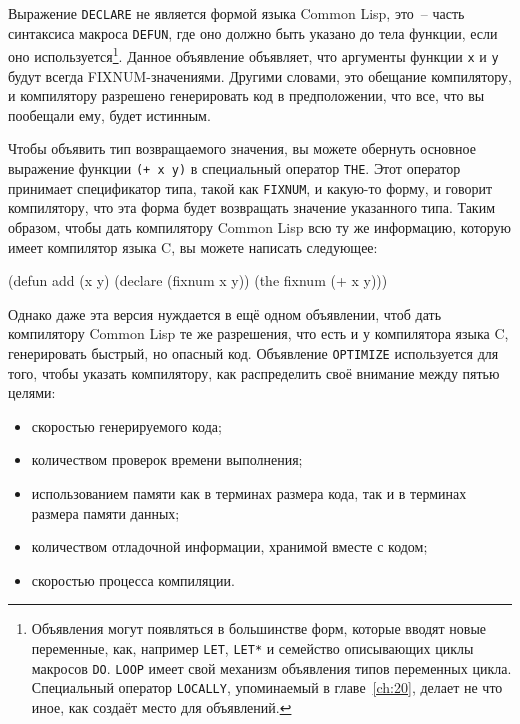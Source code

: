 Выражение \lstinline{DECLARE} не является формой языка Common Lisp, это~-- часть
синтаксиса макроса \lstinline{DEFUN}, где оно должно быть указано до тела функции, если
оно используется\footnote{Объявления могут появляться в большинстве форм, которые вводят
  новые переменные, как, например \lstinline{LET}, \lstinline{LET*} и семейство
  описывающих циклы макросов \lstinline{DO}. \lstinline{LOOP} имеет свой механизм
  объявления типов переменных цикла. Специальный оператор \lstinline{LOCALLY}, упоминаемый
  в главе~\ref{ch:20}, делает не что иное, как создаёт место для объявлений.}\hspace{\footnotenegspace}. Данное
объявление объявляет, что аргументы функции \lstinline{x} и \lstinline{y} будут всегда
FIXNUM-значениями. Другими словами, это обещание компилятору, и компилятору разрешено
генерировать код в предположении, что все, что вы пообещали ему, будет истинным.

Чтобы объявить тип возвращаемого значения, вы можете обернуть основное выражение функции
\lstinline{(+ x y)} в специальный оператор \lstinline{THE}. Этот оператор принимает спецификатор
типа, такой как \lstinline{FIXNUM}, и какую-то форму, и говорит компилятору, что эта форма
будет возвращать значение указанного типа. Таким образом, чтобы дать компилятору Common
Lisp всю ту же информацию, которую имеет компилятор языка C, вы можете написать следующее:

\begin{myverb}
(defun add (x y)
  (declare (fixnum x y))
  (the fixnum (+ x y)))
\end{myverb}

Однако даже эта версия нуждается в ещё одном объявлении, чтоб дать компилятору Common Lisp
те же разрешения, что есть и у компилятора языка C, генерировать быстрый, но опасный
код. Объявление \lstinline{OPTIMIZE} используется для того, чтобы указать компилятору, как
распределить своё внимание между пятью целями:

\begin{itemize}
\item скоростью генерируемого кода;
\item количеством проверок времени выполнения;
\item использованием памяти как в терминах размера кода, так и в терминах размера памяти
  данных;
\item количеством отладочной информации, хранимой вместе с кодом;
\item скоростью процесса компиляции.
\end{itemize}

